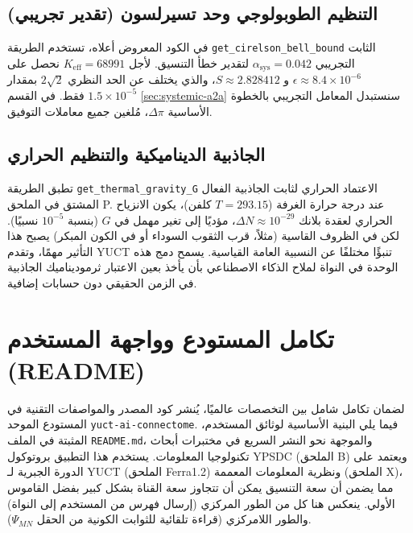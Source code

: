 \documentclass[12pt,a4paper]{article}
\begin{document}
	\subsection{التنظيم الطوبولوجي وحد تسيرلسون (تقدير تجريبي)}
	\label{sec:bell-regularization}
	
	في الكود المعروض أعلاه، تستخدم الطريقة \texttt{get\_cirelson\_bell\_bound} الثابت التجريبي \(\alpha_{\text{sys}} = 0.042\) لتقدير خطأ التنسيق. لأجل \(K_{\mathrm{eff}} = 68991\) نحصل على \(\epsilon \approx 8.4 \times 10^{-6}\) و \(S \approx 2.828412\)، والذي يختلف عن الحد النظري \(2\sqrt{2}\) بمقدار \(1.5 \times 10^{-5}\) فقط. في القسم \ref{sec:systemic-a2a} سنستبدل المعامل التجريبي بالخطوة الأساسية \(\Delta\pi\)، مُلغين جميع معاملات التوفيق.
	
	\subsection{الجاذبية الديناميكية والتنظيم الحراري}
	\label{subsec:thermal-gravity}
	
	تطبق الطريقة \texttt{get\_thermal\_gravity\_G} الاعتماد الحراري لثابت الجاذبية الفعال المشتق في الملحق P. عند درجة حرارة الغرفة (\(T = 293.15\) كلفن)، يكون الانزياح الحراري لعقدة بلانك \(\Delta N \approx 10^{-29}\)، مؤديًا إلى تغير مهمل في \(G\) (بنسبة \(10^{-5}\) نسبيًا). لكن في الظروف القاسية (مثلاً، قرب الثقوب السوداء أو في الكون المبكر) يصبح هذا التأثير مهمًا، وتقدم YUCT تنبؤًا مختلفًا عن النسبية العامة القياسية. يسمح دمج هذه الوحدة في النواة لملاح الذكاء الاصطناعي بأن يأخذ بعين الاعتبار ثرموديناميك الجاذبية في الزمن الحقيقي دون حسابات إضافية.
	
	\section{تكامل المستودع وواجهة المستخدم (README)}
	لضمان تكامل شامل بين التخصصات عالميًا، يُنشر كود المصدر والمواصفات التقنية في المستودع الموحد \texttt{yuct-ai-connectome}. فيما يلي البنية الأساسية لوثائق المستخدم، المثبتة في الملف \texttt{README.md}، والموجهة نحو النشر السريع في مختبرات أبحاث تكنولوجيا المعلومات. يستخدم هذا التطبيق بروتوكول YPSDC (الملحق B) ويعتمد على الدورة الجبرية لـ YUCT (الملحق Ferra1.2) ونظرية المعلومات المعممة (الملحق X)، مما يضمن أن سعة التنسيق يمكن أن تتجاوز سعة القناة بشكل كبير بفضل القاموس الأولي. ينعكس هنا كل من الطور المركزي (إرسال فهرس من المستخدم إلى النواة) والطور اللامركزي (قراءة تلقائية للثوابت الكونية من الحقل \(\Psi_{MN}\)).
	
\end{document}
